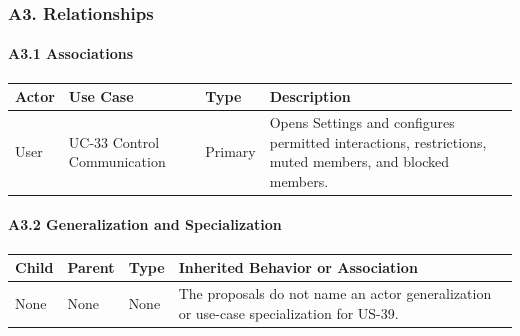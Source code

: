 \documentclass[12pt]{article}
\renewcommand{\baselinestretch}{1.5}
\begin{document}
\hypertarget{sec:a3-relationships}{}
\subsubsection*{A3. Relationships}
\par\medskip

\hypertarget{sec:a3-1-associations}{}
\paragraph*{A3.1 Associations}
\par\medskip

\begingroup
\small
\renewcommand{\baselinestretch}{1.0}\selectfont
\renewcommand{\arraystretch}{1.15}
\setlength{\tabcolsep}{6pt}
\begin{longtable}{|>{\raggedright\arraybackslash}p{}|>{\raggedright\arraybackslash}p{}|>{\raggedright\arraybackslash}p{}|>{\raggedright\arraybackslash}p{}|}
\hline
\textbf{Actor} & \textbf{Use Case} & \textbf{Type} & \textbf{Description} \\ \hline
\endhead
User & UC-33 Control Communication & Primary & Opens Settings and configures permitted interactions, restrictions, muted members, and blocked members. \\ \hline
\end{longtable}
\endgroup
\par\medskip

\hypertarget{sec:a3-2-generalization-and-specialization}{}
\paragraph*{A3.2 Generalization and Specialization}
\par\medskip

\begingroup
\small
\renewcommand{\baselinestretch}{1.0}\selectfont
\renewcommand{\arraystretch}{1.15}
\setlength{\tabcolsep}{6pt}
\begin{longtable}{|>{\raggedright\arraybackslash}p{}|>{\raggedright\arraybackslash}p{}|>{\raggedright\arraybackslash}p{}|>{\raggedright\arraybackslash}p{}|}
\hline
\textbf{Child} & \textbf{Parent} & \textbf{Type} & \textbf{Inherited Behavior or Association} \\ \hline
\endhead
None & None & None & The proposals do not name an actor generalization or use-case specialization for US-39. \\ \hline
\end{longtable}
\endgroup
\par\medskip
\end{document}
